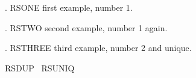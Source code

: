 
\usepackage{hyperref}

\ex.\label{rs:one} RSONE first example, number 1.

\setcounter{ExNo}{0}

\ex. RSTWO second example, number 1 again.

\ex. RSTHREE third example, number 2 and unique.

RSDUP \LLast\ RSUNIQ \Last


